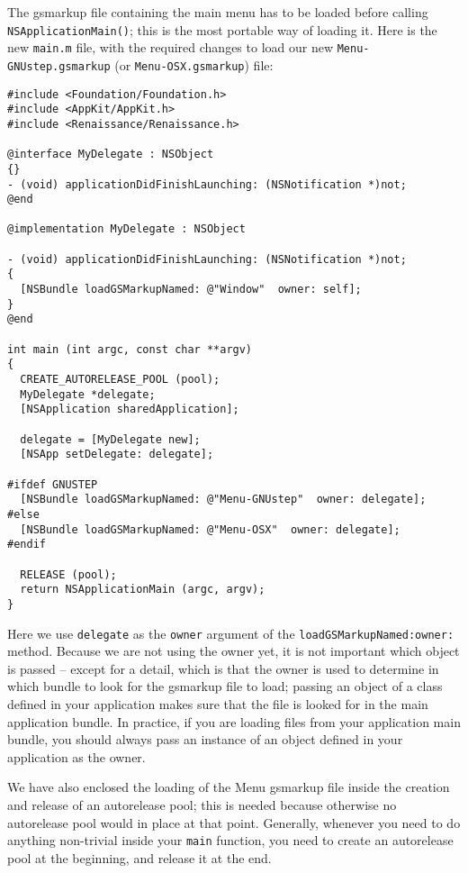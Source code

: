 \documentclass[a4paper]{article}
\begin{document}
The gsmarkup file containing the main menu has to be loaded before
calling \texttt{NSApplicationMain()}; this is the most portable way of
loading it.  Here is the new \texttt{main.m} file, with the required
changes to load our new \texttt{Menu-GNUstep.gsmarkup} (or
\texttt{Menu-OSX.gsmarkup}) file:
\begin{verbatim}
#include <Foundation/Foundation.h>
#include <AppKit/AppKit.h>
#include <Renaissance/Renaissance.h>

@interface MyDelegate : NSObject
{}
- (void) applicationDidFinishLaunching: (NSNotification *)not;
@end

@implementation MyDelegate : NSObject 

- (void) applicationDidFinishLaunching: (NSNotification *)not;
{
  [NSBundle loadGSMarkupNamed: @"Window"  owner: self];
}
@end

int main (int argc, const char **argv)
{ 
  CREATE_AUTORELEASE_POOL (pool);
  MyDelegate *delegate;
  [NSApplication sharedApplication];

  delegate = [MyDelegate new];
  [NSApp setDelegate: delegate];

#ifdef GNUSTEP
  [NSBundle loadGSMarkupNamed: @"Menu-GNUstep"  owner: delegate];
#else
  [NSBundle loadGSMarkupNamed: @"Menu-OSX"  owner: delegate];
#endif

  RELEASE (pool);
  return NSApplicationMain (argc, argv);
}
\end{verbatim}
Here we use \texttt{delegate} as the \texttt{owner} argument of the
\texttt{loadGSMarkupNamed:owner:} method.  Because we are not using
the owner yet, it is not important which object is passed -- except
for a detail, which is that the owner is used to determine in which
bundle to look for the gsmarkup file to load; passing an object of a
class defined in your application makes sure that the file is looked
for in the main application bundle.  In practice, if you are loading
files from your application main bundle, you should always pass an
instance of an object defined in your application as the owner.

We have also enclosed the loading of the Menu gsmarkup file inside the
creation and release of an autorelease pool; this is needed because
otherwise no autorelease pool would in place at that point.
Generally, whenever you need to do anything non-trivial inside your
\texttt{main} function, you need to create an autorelease pool 
at the beginning, and release it at the end.
\end{document}
